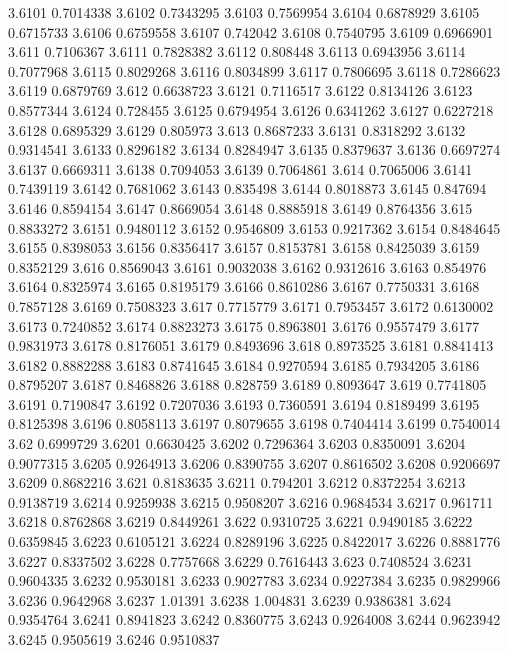 3.6101  0.7014338
3.6102  0.7343295
3.6103  0.7569954
3.6104  0.6878929
3.6105  0.6715733
3.6106  0.6759558
3.6107  0.742042
3.6108  0.7540795
3.6109  0.6966901
3.611  0.7106367
3.6111  0.7828382
3.6112  0.808448
3.6113  0.6943956
3.6114  0.7077968
3.6115  0.8029268
3.6116  0.8034899
3.6117  0.7806695
3.6118  0.7286623
3.6119  0.6879769
3.612  0.6638723
3.6121  0.7116517
3.6122  0.8134126
3.6123  0.8577344
3.6124  0.728455
3.6125  0.6794954
3.6126  0.6341262
3.6127  0.6227218
3.6128  0.6895329
3.6129  0.805973
3.613  0.8687233
3.6131  0.8318292
3.6132  0.9314541
3.6133  0.8296182
3.6134  0.8284947
3.6135  0.8379637
3.6136  0.6697274
3.6137  0.6669311
3.6138  0.7094053
3.6139  0.7064861
3.614  0.7065006
3.6141  0.7439119
3.6142  0.7681062
3.6143  0.835498
3.6144  0.8018873
3.6145  0.847694
3.6146  0.8594154
3.6147  0.8669054
3.6148  0.8885918
3.6149  0.8764356
3.615  0.8833272
3.6151  0.9480112
3.6152  0.9546809
3.6153  0.9217362
3.6154  0.8484645
3.6155  0.8398053
3.6156  0.8356417
3.6157  0.8153781
3.6158  0.8425039
3.6159  0.8352129
3.616  0.8569043
3.6161  0.9032038
3.6162  0.9312616
3.6163  0.854976
3.6164  0.8325974
3.6165  0.8195179
3.6166  0.8610286
3.6167  0.7750331
3.6168  0.7857128
3.6169  0.7508323
3.617  0.7715779
3.6171  0.7953457
3.6172  0.6130002
3.6173  0.7240852
3.6174  0.8823273
3.6175  0.8963801
3.6176  0.9557479
3.6177  0.9831973
3.6178  0.8176051
3.6179  0.8493696
3.618  0.8973525
3.6181  0.8841413
3.6182  0.8882288
3.6183  0.8741645
3.6184  0.9270594
3.6185  0.7934205
3.6186  0.8795207
3.6187  0.8468826
3.6188  0.828759
3.6189  0.8093647
3.619  0.7741805
3.6191  0.7190847
3.6192  0.7207036
3.6193  0.7360591
3.6194  0.8189499
3.6195  0.8125398
3.6196  0.8058113
3.6197  0.8079655
3.6198  0.7404414
3.6199  0.7540014
3.62  0.6999729
3.6201  0.6630425
3.6202  0.7296364
3.6203  0.8350091
3.6204  0.9077315
3.6205  0.9264913
3.6206  0.8390755
3.6207  0.8616502
3.6208  0.9206697
3.6209  0.8682216
3.621  0.8183635
3.6211  0.794201
3.6212  0.8372254
3.6213  0.9138719
3.6214  0.9259938
3.6215  0.9508207
3.6216  0.9684534
3.6217  0.961711
3.6218  0.8762868
3.6219  0.8449261
3.622  0.9310725
3.6221  0.9490185
3.6222  0.6359845
3.6223  0.6105121
3.6224  0.8289196
3.6225  0.8422017
3.6226  0.8881776
3.6227  0.8337502
3.6228  0.7757668
3.6229  0.7616443
3.623  0.7408524
3.6231  0.9604335
3.6232  0.9530181
3.6233  0.9027783
3.6234  0.9227384
3.6235  0.9829966
3.6236  0.9642968
3.6237  1.01391
3.6238  1.004831
3.6239  0.9386381
3.624  0.9354764
3.6241  0.8941823
3.6242  0.8360775
3.6243  0.9264008
3.6244  0.9623942
3.6245  0.9505619
3.6246  0.9510837
